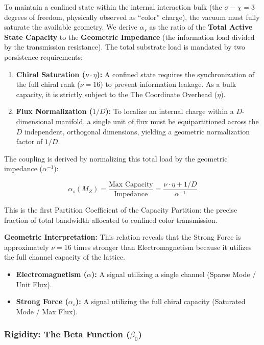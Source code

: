 To maintain a confined state within the internal interaction bulk (the $\sigma - \chi = 3$ degrees of freedom, physically observed as ``color'' charge), the vacuum must fully saturate the available geometry. We derive $\alpha_s$ as the ratio of the \textbf{Total Active State Capacity} to the \textbf{Geometric Impedance} (the information load divided by the transmission resistance). The total substrate load is mandated by two persistence requirements:
\begin{enumerate}
    \item \textbf{Chiral Saturation ($\nu \cdot \eta$):} A confined state requires the synchronization of the full chiral rank ($\nu=16$) to prevent information leakage. As a bulk capacity, it is strictly subject to the The Coordinate Overhead ($\eta$).
    \item \textbf{Flux Normalization ($1/D$):} To localize an internal charge within a $D$-dimensional manifold, a single unit of flux must be equipartitioned across the $D$ independent, orthogonal dimensions, yielding a geometric normalization factor of $1/D$.
\end{enumerate}

The coupling is derived by normalizing this total load by the geometric impedance ($\alpha^{-1}$):

\begin{equation} \label{eq:alphas_saturation}
\alpha_s(M_Z) = \frac{\text{Max Capacity}}{\text{Impedance}} 
= \frac{\nu \cdot \eta + 1/D}{\alpha^{-1}}
\end{equation}

This is the first Partition Coefficient of the Capacity Partition: the precise fraction of total bandwidth allocated to confined color transmission.

\textbf{Geometric Interpretation:} This relation reveals that the Strong Force is approximately $\nu = 16$ times stronger than Electromagnetism because it utilizes the full channel capacity of the lattice.
\begin{itemize}
    \item \textbf{Electromagnetism ($\alpha$):} A signal utilizing a single channel (Sparse Mode / Unit Flux).
    \item \textbf{Strong Force ($\alpha_s$):} A signal utilizing the full chiral capacity (Saturated Mode / Max Flux).
\end{itemize}

\subsubsection{Rigidity: The Beta Function (\texorpdfstring{$\beta_0$}{beta\_0})}


